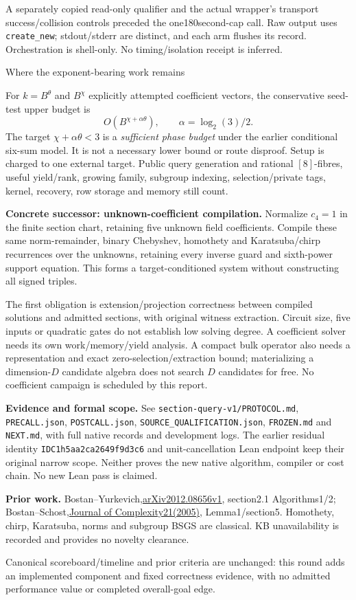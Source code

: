 \documentclass[10pt]{article}
\begin{document}
A separately copied read-only qualifier and the actual wrapper's transport
success/collision controls preceded the one180second-cap call. Raw output uses
\texttt{create\_new}; stdout/stderr are distinct, and each arm flushes its record.
Orchestration is shell-only. No timing/isolation receipt is inferred.

\newpage
{\large Where the exponent-bearing work remains}\par
For $k=B^\theta$ and $B^\chi$ explicitly attempted coefficient vectors,
the conservative seed-test upper budget is
\[
O(B^{\chi+\alpha\theta}),\qquad\alpha=\log_2(3)/2.
\]
The target $\chi+\alpha\theta<3$ is a \emph{sufficient phase budget} under the
earlier conditional six-sum model. It is not a necessary lower bound or route
disproof. Setup is charged to one external target. Public query generation and
rational $[8]$-fibres, useful yield/rank, growing family, subgroup indexing,
selection/private tags, kernel, recovery, row storage and memory still count.

\textbf{Concrete successor: unknown-coefficient compilation.}
Normalize $c_4=1$ in the finite section chart, retaining five unknown field
coefficients. Compile these same norm-remainder, binary Chebyshev,
homothety and Karatsuba/chirp recurrences over the unknowns, retaining every
inverse guard and sixth-power support equation. This forms a target-conditioned
system without constructing all signed triples.

The first obligation is extension/projection correctness between compiled
solutions and admitted sections, with original witness extraction. Circuit
size, five inputs or quadratic gates do not establish low solving degree.
A coefficient solver needs its own work/memory/yield analysis. A compact bulk
operator also needs a representation and exact zero-selection/extraction bound;
materializing a dimension-$D$ candidate algebra does not search $D$ candidates
for free. No coefficient campaign is scheduled by this report.

\textbf{Evidence and formal scope.}
See \texttt{section-query-v1/PROTOCOL.md}, \texttt{PRECALL.json},
\texttt{POSTCALL.json}, \texttt{SOURCE\_QUALIFICATION.json}, \texttt{FROZEN.md}
and \texttt{NEXT.md}, with full native records and development logs.
The earlier residual identity \texttt{IDC1h5aa2ca2649f9d3c6} and unit-cancellation
Lean endpoint keep their original narrow scope. Neither proves the new native
algorithm, compiler or cost chain. No new Lean pass is claimed.

\textbf{Prior work.}
Bostan--Yurkevich,\href{https://arxiv.org/pdf/2012.08656v1}{arXiv2012.08656v1},
section2.1 Algorithms1/2; Bostan--Schost,\href{https://mathexp.eu/bostan/publications/BoSc05.pdf}{Journal of Complexity21(2005)},
Lemma1/section5. Homothety, chirp, Karatsuba, norms and subgroup BSGS are classical.
KB unavailability is recorded and provides no novelty clearance.

Canonical scoreboard/timeline and prior criteria are unchanged: this round adds
an implemented component and fixed correctness evidence, with no admitted
performance value or completed overall-goal edge.
\end{document}
